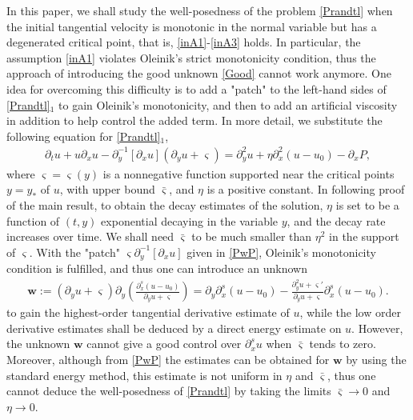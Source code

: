 \documentclass{amsart}
\numberwithin{equation}{section}
\begin{document}
In this paper, we shall study the well-posedness of the problem \eqref{Prandtl} when the initial tangential velocity is monotonic in the normal variable but has a degenerated critical point, that is, \eqref{inA1}-\eqref{inA3} holds. In particular, the assumption \eqref{inA1} violates Oleinik's strict monotonicity condition, thus the approach of introducing the good unknown \eqref{Good} cannot work anymore. One idea for overcoming this difficulty is to add a "patch" to the left-hand sides of \eqref{Prandtl}$_{1}$ to gain Oleinik's monotonicity, and then to add an artificial viscosity in addition to help control the added term. In more detail, we substitute the following equation for \eqref{Prandtl}$_{1}$,
\begin{align}\label{PwP}
\partial_{t}u+u\partial_{x}u-\partial_{y}^{-1}[\partial_{x}u](\partial_{y}u+\varsigma)
=\partial^2_{y}u+\eta\partial_{x}^{2}(u-u_{0})-\partial_{x}P,
\end{align}
where $\varsigma=\varsigma(y)$ is a nonnegative function supported near the critical points $y=y_{*}$ of $u$, with upper bound $\bar{\varsigma}$, and $\eta$ is a positive constant. In following proof of the main result, to obtain the decay estimates of the solution, $\eta$ is set to be a function of $(t,y)$ exponential decaying in the variable $y$, and the decay rate increases over time. We shall need $\bar{\varsigma}$ to be much smaller than $\eta^{2}$ in the support of $\varsigma$. With the "patch" $\varsigma\partial_{y}^{-1}[\partial_{x}u]$ given in \eqref{PwP}, Oleinik's monotonicity condition is fulfilled, and thus one can introduce an unknown
\begin{align*}
\mathbf{w}:=(\partial_{y}u+\varsigma)\partial_{y}\left(\frac{\partial_{x}^{s}(u-u_{0})}{\partial_{y}u+\varsigma}\right)
           =\partial_{y}\partial_{x}^{s}(u-u_{0})-\frac{\partial_{y}^{2}u+\varsigma'}{\partial_{y}u+\varsigma}\partial_{x}^{s}(u-u_{0}).
\end{align*}
to gain the highest-order tangential derivative estimate of $u$, while the low order derivative estimates shall be deduced by a direct energy estimate on $u$.  However, the unknown $\mathbf{w}$ cannot give a good control over $\partial_{x}^{s}u$ when $\bar{\varsigma}$ tends to zero. Moreover, although from \eqref{PwP} the estimates can be obtained  for $\mathbf{w}$  by using the standard energy method, this estimate is not uniform in $\eta$ and $\bar{\varsigma}$, thus one cannot deduce the well-posedness of \eqref{Prandtl} by  taking the limits $\bar{\varsigma}\to0$ and $\eta\to0$.
\end{document}
